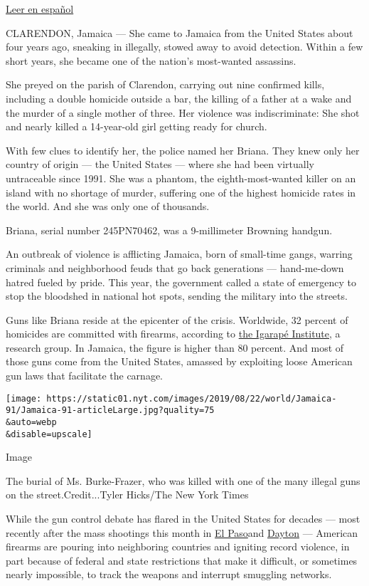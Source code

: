 \href{https://www.nytimes.com/es/2019/08/26/espanol/america-latina/jamaica-violencia-armas.html}{Leer
en español}

CLARENDON, Jamaica --- She came to Jamaica from the United States about
four years ago, sneaking in illegally, stowed away to avoid detection.
Within a few short years, she became one of the nation's most-wanted
assassins.

She preyed on the parish of Clarendon, carrying out nine confirmed
kills, including a double homicide outside a bar, the killing of a
father at a wake and the murder of a single mother of three. Her
violence was indiscriminate: She shot and nearly killed a 14-year-old
girl getting ready for church.

With few clues to identify her, the police named her Briana. They knew
only her country of origin --- the United States --- where she had been
virtually untraceable since 1991. She was a phantom, the
eighth-most-wanted killer on an island with no shortage of murder,
suffering one of the highest homicide rates in the world. And she was
only one of thousands.

Briana, serial number 245PN70462, was a 9-millimeter Browning handgun.

An outbreak of violence is afflicting Jamaica, born of small-time gangs,
warring criminals and neighborhood feuds that go back generations ---
hand-me-down hatred fueled by pride. This year, the government called a
state of emergency to stop the bloodshed in national hot spots, sending
the military into the streets.

Guns like Briana reside at the epicenter of the crisis. Worldwide, 32
percent of homicides are committed with firearms, according to
\href{https://igarape.org.br/en/apps/homicide-monitor/}{the Igarapé
Institute}, a research group. In Jamaica, the figure is higher than 80
percent. And most of those guns come from the United States, amassed by
exploiting loose American gun laws that facilitate the carnage.

\texttt{[image: https://static01.nyt.com/images/2019/08/22/world/Jamaica-91/Jamaica-91-articleLarge.jpg?quality=75\\\&auto=webp\\\&disable=upscale]}

Image

The burial of Ms. Burke-Frazer, who was killed with one of the many
illegal guns on the street.Credit...Tyler Hicks/The New York Times

While the gun control debate has flared in the United States for decades
--- most recently after the mass shootings this month in
\href{https://www.nytimes.com/2019/08/03/us/el-paso-shooting.html?module=inline}{El
Paso}and
\href{https://www.nytimes.com/2019/08/04/us/dayton-ohio-shooting.html}{Dayton}
--- American firearms are pouring into neighboring countries and
igniting record violence, in part because of federal and state
restrictions that make it difficult, or sometimes nearly impossible, to
track the weapons and interrupt smuggling networks.

